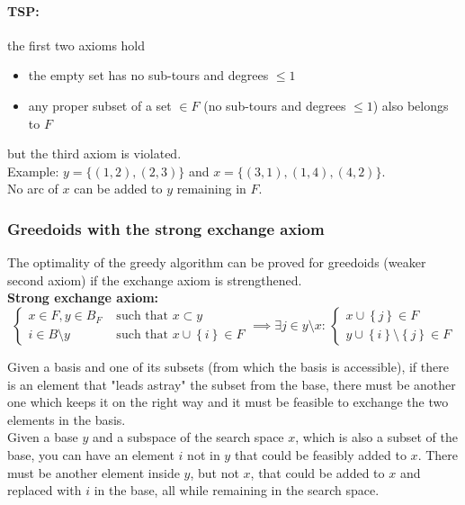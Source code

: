 \documentclass[11pt]{article}
\begin{document}
	\vfill
	
	\paragraph{TSP:} the first two axioms hold
	\begin{itemize}
		\item the empty set has no sub-tours and degrees $\leq 1$
		\item any proper subset of a set $\in F$ (no sub-tours and degrees $\leq 1$) also belongs to $F$
	\end{itemize}
	but the third axiom is violated.\\
	Example: $y = \{(1, 2), (2, 3)\}$ and $x = \{(3, 1), (1, 4), (4, 2)\}$.\\
	No arc of $x$ can be added to $y$ remaining in $F$.\\
	
	\newpage
	
	\subsubsection{Greedoids with the strong exchange axiom}
	The optimality of the greedy algorithm can be proved for greedoids (weaker second axiom) if the exchange axiom is strengthened.\\
	
	\textbf{Strong exchange axiom:}
	$$ 
	\begin{cases}
		x \in F, y \in B_F & \text{ such that } x \subset y \\
		i \in B \setminus y & \text{ such that } x \cup \left\{i\right\} \in F
	\end{cases}
	\implies \exists j \in y \setminus x: \, 
	\begin{cases}
		x \cup \left\{j\right\} \in F \\
		y \cup \left\{i\right\} \setminus \left\{j\right\} \in F
	\end{cases}
	$$
	
	Given a basis and one of its subsets (from which the basis is accessible), if there is an element that "leads astray" the subset from the base, there must be another one which keeps it on the right way and it must be feasible to exchange the two elements in the basis.\\
	
	Given a base $y$ and a subspace of the search space $x$, which is also a subset of the base, you can have an element $i$ not in $y$ that could be feasibly added to $x$. There must be another element inside $y$, but not $x$, that could be added to $x$ and replaced with $i$ in the base, all while remaining in the search space.\\
	
\end{document}
